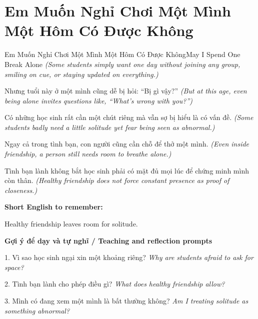 \section{Em Muốn Nghỉ Chơi Một Mình Một Hôm Có Được Không}
\begin{truyen}{Em Muốn Nghỉ Chơi Một Mình Một Hôm Có Được Không}{May I Spend One Break Alone}
\textit{(Some students simply want one day without joining any group, smiling on cue, or staying updated on everything.)}

Nhưng tuổi này ở một mình cũng dễ bị hỏi: “Bị gì vậy?”
\textit{(But at this age, even being alone invites questions like, “What's wrong with you?”)}

Có những học sinh rất cần một chút riêng mà vẫn sợ bị hiểu là có vấn đề.
\textit{(Some students badly need a little solitude yet fear being seen as abnormal.)}

Ngay cả trong tình bạn, con người cũng cần chỗ để thở một mình.
\textit{(Even inside friendship, a person still needs room to breathe alone.)}

\end{truyen}

\begin{baihoc}
Tình bạn lành không bắt học sinh phải có mặt đủ mọi lúc để chứng minh mình còn thân.
\textit{(Healthy friendship does not force constant presence as proof of closeness.)}
\end{baihoc}

\begin{ghinhoanh}
\textbf{Short English to remember:}

Healthy friendship leaves room for solitude.

\end{ghinhoanh}

\begin{tuhocnhanh}
\textbf{Gợi ý để dạy và tự nghĩ / Teaching and reflection prompts}

1. Vì sao học sinh ngại xin một khoảng riêng? \textit{Why are students afraid to ask for space?}

2. Tình bạn lành cho phép điều gì? \textit{What does healthy friendship allow?}

3. Mình có đang xem một mình là bất thường không? \textit{Am I treating solitude as something abnormal?}
\end{tuhocnhanh}
\ngancach

